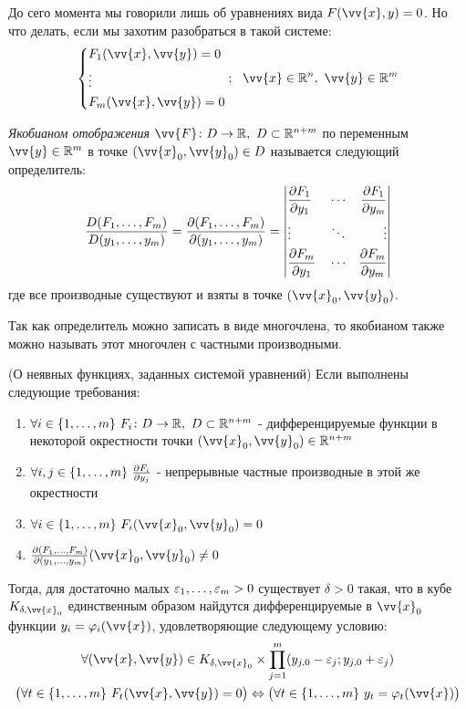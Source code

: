 \begin{note}
	До сего момента мы говорили лишь об уравнениях вида $F(\vv{x}, y) = 0$. Но что делать, если мы захотим разобраться в такой системе:
	\[
		\System{
			&{F_1(\vv{x}, \vv{y}) = 0}
			\\
			&{\vdots}
			\\
			&{F_m(\vv{x}, \vv{y}) = 0}
		};
		\ \ \vv{x} \in \R^n,\ \vv{y} \in \R^m
	\]
\end{note}

\begin{definition}
	\textit{Якобианом отображения} $\vv{F} \colon D \to \R,\ D \subset \R^{n + m}$ по переменным $\vv{y} \in \R^m$ в точке $(\vv{x}_0, \vv{y}_0) \in D$ называется следующий определитель:
	\[
		\frac{D(F_1, \ldots, F_m)}{D(y_1, \ldots, y_m)} = \frac{\partial (F_1, \ldots, F_m)}{\partial (y_1, \ldots, y_m)} = \left|\begin{aligned}
			&{\frac{\partial F_1}{\partial y_1}} & &\cdots &{\frac{\partial F_1}{\partial y_m}}
			\\
			&{\vdots} & &\ddots &\vdots
			\\
			&{\frac{\partial F_m}{\partial y_1}} & &\cdots &{\frac{\partial F_m}{\partial y_m}} 
		\end{aligned}\right|
	\]
	где все производные существуют и взяты в точке $(\vv{x}_0, \vv{y}_0)$.
\end{definition}

\begin{note}
	Так как определитель можно записать в виде многочлена, то якобианом также можно называть этот многочлен с частными производными.
\end{note}

\begin{theorem} (О неявных функциях, заданных системой уравнений)
	Если выполнены следующие требования:
	\begin{enumerate}
		\item $\forall i \in \{1, \ldots, m\}\ F_i \colon D \to \mathbb{R},\ D \subset \mathbb{R}^{n + m}$ - дифференцируемые функции в некоторой окрестности точки $(\vv{x}_0, \vv{y}_0) \in \R^{n + m}$
		
		\item $\forall i, j \in \range{m}\ \pd{F_i}{y_j}$ - непрерывные частные производные в этой же окрестности
		
		\item $\forall i \in \range{m}\ F_i(\vv{x}_0, \vv{y}_0) = 0$
		
		\item $\pd{(F_1, \ldots, F_m)}{(y_1, \ldots, y_m)}(\vv{x}_0, \vv{y}_0) \neq 0$
	\end{enumerate}
	Тогда, для достаточно малых $\varepsilon_1, \ldots, \varepsilon_m > 0$ существует $\delta > 0$ такая, что в кубе $K_{\delta, \vv{x}_0}$ единственным образом найдутся дифференцируемые в $\vv{x}_0$ функции $y_i = \phi_i(\vv{x})$, удовлетворяющие следующему условию:
	\begin{multline*}
		\forall (\vv{x}, \vv{y}) \in K_{\delta, \vv{x}_0} \times \prod_{j = 1}^m (y_{j, 0} - \eps_j; y_{j, 0} + \eps_j)
		\\
		\big(\forall t \in \range{m}\ F_t(\vv{x}, \vv{y}) = 0\big) \lra \big(\forall t \in \range{m}\ y_t = \phi_t(\vv{x})\big)
	\end{multline*}
\end{theorem}


